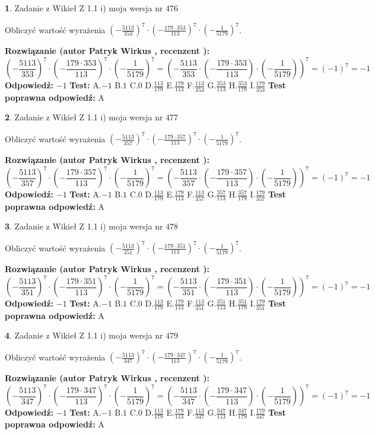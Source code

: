 \documentclass[12pt, a4paper]{article}
\theoremstyle{definition} %
\newtheorem{zad}{}
\newcommand{\zadStart}[1]{\begin{zad}#1\newline}
\newcommand{\zadStop}{\end{zad}}
\newcommand{\rozwStart}[2]{\noindent \textbf{Rozwiązanie (autor #1 , recenzent #2): }\newline}
\newcommand{\rozwStop}{\newline}
\newcommand{\odpStart}{\noindent \textbf{Odpowiedź:}\newline}
\newcommand{\odpStop}{\newline}
\newcommand{\testStart}{\noindent \textbf{Test:}\newline}
\newcommand{\testStop}{\newline}
\newcommand{\kluczStart}{\noindent \textbf{Test poprawna odpowiedź:}\newline}
\newcommand{\kluczStop}{\newline}
\begin{document}
\zadStart{Zadanie z Wikieł Z 1.1 i) moja wersja nr 476}

Obliczyć wartość wyrażenia $(-\frac{5113}{353})^{7} \cdot (-\frac{179 \cdot 353}{113})^{7} \cdot (-\frac{1}{5179})^{7}$.
\zadStop
\rozwStart{Patryk Wirkus}{}
$$(-\frac{5113}{353})^{7} \cdot (-\frac{179 \cdot 353}{113})^{7} \cdot (-\frac{1}{5179})^{7} = (-\frac{5113}{353} \cdot (-\frac{179 \cdot 353}{113}) \cdot (-\frac{1}{5179}))^{7} = (-1)^{7} = -1$$
\rozwStop
\odpStart
$-1$
\odpStop
\testStart
A.$-1$ B.$1$ C.$0$ D.$\frac{113}{179}$ E.$\frac{179}{113}$
F.$\frac{113}{353}$ G.$\frac{353}{113}$
H.$\frac{353}{179}$
I.$\frac{179}{353}$
\testStop
\kluczStart
A
\kluczStop



\zadStart{Zadanie z Wikieł Z 1.1 i) moja wersja nr 477}

Obliczyć wartość wyrażenia $(-\frac{5113}{357})^{7} \cdot (-\frac{179 \cdot 357}{113})^{7} \cdot (-\frac{1}{5179})^{7}$.
\zadStop
\rozwStart{Patryk Wirkus}{}
$$(-\frac{5113}{357})^{7} \cdot (-\frac{179 \cdot 357}{113})^{7} \cdot (-\frac{1}{5179})^{7} = (-\frac{5113}{357} \cdot (-\frac{179 \cdot 357}{113}) \cdot (-\frac{1}{5179}))^{7} = (-1)^{7} = -1$$
\rozwStop
\odpStart
$-1$
\odpStop
\testStart
A.$-1$ B.$1$ C.$0$ D.$\frac{113}{179}$ E.$\frac{179}{113}$
F.$\frac{113}{357}$ G.$\frac{357}{113}$
H.$\frac{357}{179}$
I.$\frac{179}{357}$
\testStop
\kluczStart
A
\kluczStop



\zadStart{Zadanie z Wikieł Z 1.1 i) moja wersja nr 478}

Obliczyć wartość wyrażenia $(-\frac{5113}{351})^{7} \cdot (-\frac{179 \cdot 351}{113})^{7} \cdot (-\frac{1}{5179})^{7}$.
\zadStop
\rozwStart{Patryk Wirkus}{}
$$(-\frac{5113}{351})^{7} \cdot (-\frac{179 \cdot 351}{113})^{7} \cdot (-\frac{1}{5179})^{7} = (-\frac{5113}{351} \cdot (-\frac{179 \cdot 351}{113}) \cdot (-\frac{1}{5179}))^{7} = (-1)^{7} = -1$$
\rozwStop
\odpStart
$-1$
\odpStop
\testStart
A.$-1$ B.$1$ C.$0$ D.$\frac{113}{179}$ E.$\frac{179}{113}$
F.$\frac{113}{351}$ G.$\frac{351}{113}$
H.$\frac{351}{179}$
I.$\frac{179}{351}$
\testStop
\kluczStart
A
\kluczStop



\zadStart{Zadanie z Wikieł Z 1.1 i) moja wersja nr 479}

Obliczyć wartość wyrażenia $(-\frac{5113}{347})^{7} \cdot (-\frac{179 \cdot 347}{113})^{7} \cdot (-\frac{1}{5179})^{7}$.
\zadStop
\rozwStart{Patryk Wirkus}{}
$$(-\frac{5113}{347})^{7} \cdot (-\frac{179 \cdot 347}{113})^{7} \cdot (-\frac{1}{5179})^{7} = (-\frac{5113}{347} \cdot (-\frac{179 \cdot 347}{113}) \cdot (-\frac{1}{5179}))^{7} = (-1)^{7} = -1$$
\rozwStop
\odpStart
$-1$
\odpStop
\testStart
A.$-1$ B.$1$ C.$0$ D.$\frac{113}{179}$ E.$\frac{179}{113}$
F.$\frac{113}{347}$ G.$\frac{347}{113}$
H.$\frac{347}{179}$
I.$\frac{179}{347}$
\testStop
\kluczStart
A
\kluczStop
\end{document}
